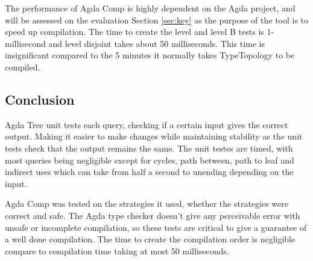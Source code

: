 The performance of Agda Comp is highly dependent on the Agda project, and will
be assessed on the evaluation Section \ref{sec:key} as the purpose of the tool
is to speed up compilation. The time to create the level and level B tests is
1-millisecond and level disjoint takes about 50 milliseconds. This time is
insignificant compared to the 5 minutes it normally takes TypeTopology to be
compiled.

\subsection{Conclusion}

Agda Tree unit tests each query, checking if a certain input gives the correct
output. Making it easier to make changes while maintaining stability as the
unit tests check that the output remains the same. The unit testes are timed,
with most queries being negligible except for cycles, path between, path to
leaf and indirect uses which can take from half a second to unending depending
on the input.  

Agda Comp was tested on the strategies it used, whether the strategies were
correct and safe. The Agda type checker doesn't give any perceivable error with
unsafe or incomplete compilation, so these tests are critical to give a
guarantee of a well done compilation. The time to create the compilation order
is negligible compare to compilation time taking at most 50 milliseconds.

%

